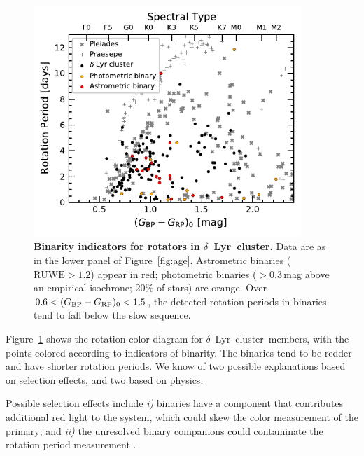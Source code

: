 \documentclass[12pt,modern,twocolumn,tighten]{aastex63}
\newcommand{\cn}{$\delta$\ Lyr\ cluster} %
\newcommand{\bpmrpo}{(G_{\rm BP}-G_{\rm RP})_0}
\begin{document}
\begin{figure}[t]
	\begin{center}
		\leavevmode
		\includegraphics[width=0.9\textwidth]{f15supp.pdf}
	\end{center}
	\vspace{-0.7cm}
  \caption{ {\bf Binarity indicators for rotators in \cn.} 
    Data are as in the lower panel of
    Figure~\ref{fig:age}.  Astrometric binaries ($\mathrm{RUWE}>1.2$)
    appear in red; photometric binaries ($>$0.3\,mag above an
    empirical isochrone; 20\% of stars) are orange.  
    Over $0.6<\bpmrpo<1.5$, the detected rotation periods in binaries tend to 
    fall below the slow sequence.
		\label{fig:binarity}
	}
\end{figure}

Figure~\ref{fig:binarity} shows the rotation-color diagram for \cn\
members, with the points colored according to indicators of binarity.
The binaries tend to be redder and have shorter rotation periods.  We
know of two possible explanations based on selection effects, and two
based on physics.

Possible selection effects include {\it i)} binaries have a component
that contributes additional red light to the system, which could skew
the color measurement of the primary; and {\it ii)} the unresolved
binary companions could contaminate the rotation period measurement
\citep[{\it e.g.},][Section~5.1]{stauffer_rotation_2016}.
\end{document}
